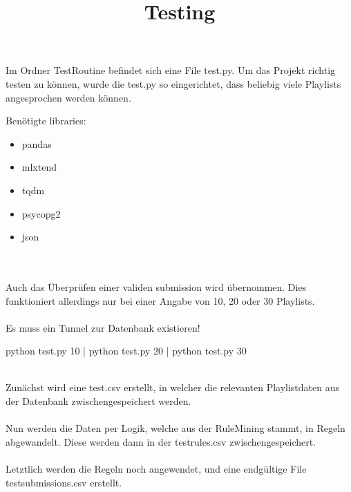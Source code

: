 \documentclass[12pt]{article}
\title{Testing}
\date{}
\begin{document}
\maketitle
\begin{center}

Im Ordner TestRoutine befindet sich eine File \color{mymauve}test.py\color{black}.
Um das Projekt richtig testen zu können, wurde die \color{mymauve}test.py \color{black} so eingerichtet, dass beliebig
viele Playlists angesprochen werden können. 
\end{center}
\hline \vspace{0.2cm}
\color{mymauve}
Benötigte libraries:
\color{black}
\begin{itemize}
    \item pandas
    \item mlxtend
    \item tqdm
    \item psycopg2
    \item json
\end{itemize}\vspace{0.2cm}
\hline \vspace{0.2cm}
\\\\
Auch das Überprüfen einer validen submission wird übernommen. Dies funktioniert allerdings nur bei einer Angabe
von \color{red}10, 20 oder 30 \color{black} Playlists.
\\\\
\hline \vspace{0.2cm}
\color{mymauve}Es muss ein Tunnel zur Datenbank existieren!\color{black}\vspace{0.2cm}
\hline \vspace{0.2cm}

\begin{center}
\begin{python}
python test.py 10  |   python test.py 20  |  python test.py 30  
\end{python}
\end{center}
\\
Zunächst wird eine \color{mymauve}test.csv \color{black} erstellt, in welcher die relevanten Playlistdaten aus der Datenbank zwischengespeichert werden.
\\\\Nun werden die Daten per Logik, welche aus der RuleMining stammt, in Regeln abgewandelt. Diese werden dann in der \color{mymauve}testrules.csv \color{black} zwischengespeichert.
\\\\Letztlich werden die Regeln noch angewendet, und eine endgültige File testsubmissions.csv erstellt.
\end{document}
